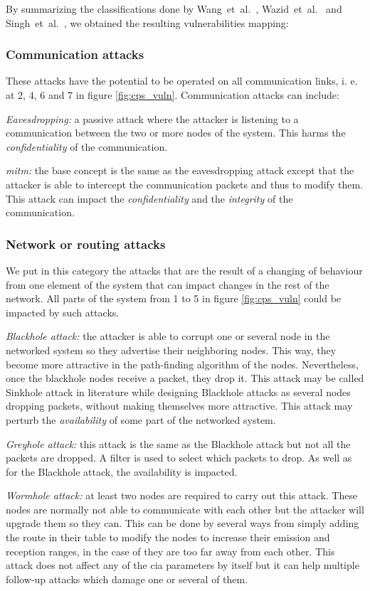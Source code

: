 \documentclass[12pt]{report}
\begin{document}
By summarizing the classifications done by Wang~et~al.~\cite{wang_security_2010}, Wazid~et~al.~\cite{wazid_2016} and Singh~et~al.~\cite{singh_review_2020}, we obtained the resulting vulnerabilities mapping:

\subsubsection{Communication attacks}
These attacks have the potential to be operated on all communication links, i. e. at 2, 4, 6 and 7 in figure \ref{fig:cps_vuln}.
Communication attacks can include:

\textit{Eavesdropping:} a passive attack where the attacker is listening to a communication between the two or more nodes of the system. This harms the \textit{confidentiality} of the communication.

\textit{\gls{mitm}:} the base concept is the same as the eavesdropping attack except that the attacker is able to intercept the communication packets and thus to modify them. This attack can impact the \textit{confidentiality} and the \textit{integrity} of the communication.

\subsubsection{Network or routing attacks}
We put in this category the attacks that are the result of a changing of behaviour from one element of the system that can impact changes in the rest of the network. 
All parts of the system from 1 to 5 in figure \ref{fig:cps_vuln} could be impacted by such attacks.

\textit{Blackhole attack:} the attacker is able to corrupt one or several node in the networked system so they advertise their neighboring nodes. This way, they become more attractive in the path-finding algorithm of the nodes. Nevertheless, once the blackhole nodes receive a packet, they drop it. This attack may be called Sinkhole attack in literature while designing Blackhole attacks as several nodes dropping packets, without making themselves more attractive. This attack may perturb the \textit{availability} of some part of the networked system.

\textit{Greyhole attack:} this attack is the same as the Blackhole attack but not all the packets are dropped. A filter is used to select which packets to drop. As well as for the Blackhole attack, the availability is impacted.

\textit{Wormhole attack:} at least two nodes are required to carry out this attack. These nodes are normally not able to communicate with each other but the attacker will upgrade them so they can. This can be done by several ways from simply adding the route in their table to modify the nodes to increase their emission and reception ranges, in the case of they are too far away from each other. This attack does not affect any of the \gls{cia} parameters by itself but it can help multiple follow-up attacks which damage one or several of them.
\end{document}
